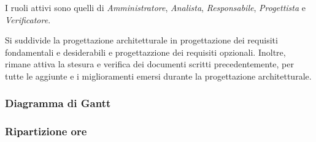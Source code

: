 I ruoli attivi sono quelli di \textit{Amministratore}, \textit{Analista}, \textit{Responsabile}, \textit{Progettista} e \textit{Verificatore}.

Si suddivide la progettazione architetturale in progettazione dei requisiti fondamentali e desiderabili e progettazzione dei requisiti opzionali. Inoltre, rimane attiva la stesura e verifica dei documenti scritti precedentemente, per tutte le aggiunte e i miglioramenti emersi durante la progettazione architetturale.

\subsubsection{Diagramma di Gantt}

\subsubsection{Ripartizione ore}
